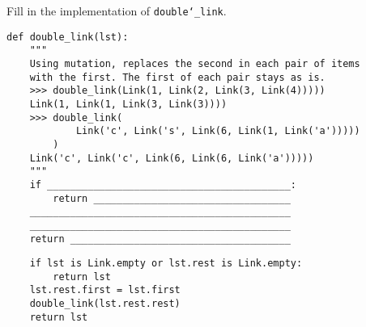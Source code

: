 \question Fill in the implementation of \texttt{double\char`_link}.

\begin{lstlisting}
def double_link(lst):
    """
    Using mutation, replaces the second in each pair of items
    with the first. The first of each pair stays as is.
    >>> double_link(Link(1, Link(2, Link(3, Link(4)))))
    Link(1, Link(1, Link(3, Link(3))))
    >>> double_link(
            Link('c', Link('s', Link(6, Link(1, Link('a')))))
        )
    Link('c', Link('c', Link(6, Link(6, Link('a')))))
    """
    if __________________________________________:
        return __________________________________
    _____________________________________________
    _____________________________________________
    return ______________________________________
\end{lstlisting}
\begin{solution}
\begin{lstlisting}
    if lst is Link.empty or lst.rest is Link.empty:
        return lst
    lst.rest.first = lst.first
    double_link(lst.rest.rest)
    return lst
\end{lstlisting}
\end{solution}
